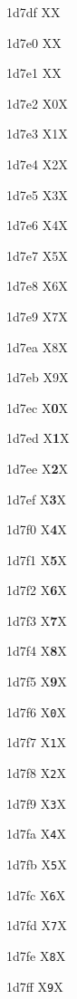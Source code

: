 \documentclass[11pt]{article}
\begin{document}
1d7df X{}X

1d7e0 X{}X

1d7e1 X{}X

1d7e2 X{\textsf{0}}X

1d7e3 X{\textsf{1}}X

1d7e4 X{\textsf{2}}X

1d7e5 X{\textsf{3}}X

1d7e6 X{\textsf{4}}X

1d7e7 X{\textsf{5}}X

1d7e8 X{\textsf{6}}X

1d7e9 X{\textsf{7}}X

1d7ea X{\textsf{8}}X

1d7eb X{\textsf{9}}X

1d7ec X{\textsf{\textbf{0}}}X

1d7ed X{\textsf{\textbf{1}}}X

1d7ee X{\textsf{\textbf{2}}}X

1d7ef X{\textsf{\textbf{3}}}X

1d7f0 X{\textsf{\textbf{4}}}X

1d7f1 X{\textsf{\textbf{5}}}X

1d7f2 X{\textsf{\textbf{6}}}X

1d7f3 X{\textsf{\textbf{7}}}X

1d7f4 X{\textsf{\textbf{8}}}X

1d7f5 X{\textsf{\textbf{9}}}X

1d7f6 X{\texttt{0}}X

1d7f7 X{\texttt{1}}X

1d7f8 X{\texttt{2}}X

1d7f9 X{\texttt{3}}X

1d7fa X{\texttt{4}}X

1d7fb X{\texttt{5}}X

1d7fc X{\texttt{6}}X

1d7fd X{\texttt{7}}X

1d7fe X{\texttt{8}}X

1d7ff X{\texttt{9}}X
\end{document}
